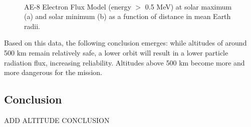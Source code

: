 \begin{figure}
  \centering
  \\                
  \caption{AE-8 Electron Flux Model (energy $>$ 0.5 MeV) at solar maximum (a) and solar minimum (b) as a function of distance in mean Earth radii.}
  \label{fig:elecFlux}
\end{figure}

Based on this data, the following conclusion emerges: while altitudes of around 500 km remain relatively safe, a lower orbit will result in a lower particle radiation flux, increasing reliability. Altitudes above 500 km become more and more dangerous for the mission.

\subsection{Conclusion}
\label{mtrAltConclusion}

ADD ALTITUDE CONCLUSION

